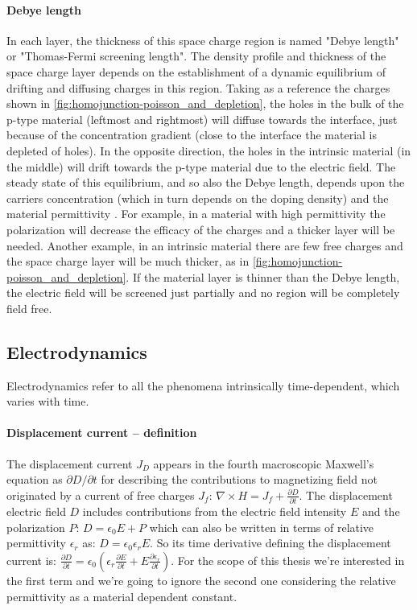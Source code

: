 		\paragraph{Debye length}\label{intro-debye_length}
		In each layer, the thickness of this space charge region is named "Debye length" or "Thomas\hyp{}Fermi screening length".
The density profile and thickness of the space charge layer depends on the establishment of a dynamic equilibrium of drifting and diffusing charges in this region.
Taking as a reference the charges shown in \cref{fig:homojunction-poisson_and_depletion}, the holes in the bulk of the p-type material (leftmost and rightmost) will diffuse towards the interface, just because of the concentration gradient (close to the interface the material is depleted of holes).
In the opposite direction, the holes in the intrinsic material (in the middle) will drift towards the p-type material due to the electric field.
The steady state of this equilibrium, and so also the Debye length, depends upon the carriers concentration (which in turn depends on the doping density) and the material permittivity \cite{WikipediaDebye2019}.
		For example, in a material with high permittivity the polarization will decrease the efficacy of the charges and a thicker layer will be needed.
		Another example, in an intrinsic material there are few free charges and the space charge layer will be much thicker, as in \cref{fig:homojunction-poisson_and_depletion}.
If the material layer is thinner than the Debye length, the electric field will be screened just partially and no region will be completely field free.
		
	\subsection{Electrodynamics}
	Electrodynamics refer to all the phenomena intrinsically time-dependent, which varies with time.

		\paragraph{Displacement current -- definition}\label{intro_displacement_current}
		The displacement current $J_D$ appears in the fourth macroscopic Maxwell's equation as $\partial D / \partial t$ for describing the contributions to magnetizing field not originated by a current of free charges $J_f$: $\nabla \times H = J_f + \frac{\partial D}{\partial t}$.
		The displacement electric field $D$ includes contributions from the electric field intensity $E$ and the polarization $P$: $D=\epsilon_0 E + P$ which can also be written in terms of relative permittivity $\epsilon_r$ as: $D= \epsilon_0 \epsilon_r E$.
		So its time derivative defining the displacement current is: $\frac{\partial D}{\partial t} = \epsilon_0 (\epsilon_r\frac{\partial E}{\partial t} + E\frac{\partial \epsilon_r}{\partial t})$.
		For the scope of this thesis we're interested in the first term and we're going to ignore the second one considering the relative permittivity as a material dependent constant.


